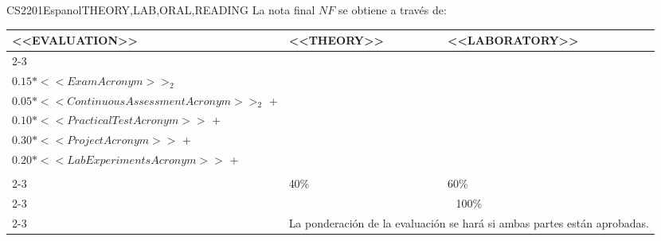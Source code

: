   \begin{evaluation}{CS2201}{Espanol}{THEORY,LAB,ORAL,READING}
  La nota final $NF$ se obtiene a través de:
  
  \begin{tabularx}{0.9\textwidth}{|X|p{}|p{}|} \hline
  \multirow{4}{*}{\uppercase{<<Evaluation>>}} & \uppercase{<<Theory>>} & \uppercase{<<Laboratory>>} \\ \cline{2-3}
  & %
      \begin{minipage}{0.95\textwidth}
      \begin{tabular}{l}
          $0.15*<<ExamAcronym>>_{1}$ + \\
          $0.15*<<ExamAcronym>>_{2}$
          \end{tabular} 
      \end{minipage} 
  & %
      \begin{minipage}{0.95\textwidth}
      \begin{tabular}{l}
          $0.05*<<ContinuousAssessmentAcronym>>_{1}$ + \\
          $0.05*<<ContinuousAssessmentAcronym>>_{2}$ + \\
          $0.10*<<PracticalTestAcronym>>$ + \\
          $0.30*<<ProjectAcronym>>$ + \\
          $0.20*<<LabExperimentsAcronym>>$ + \\
      \end{tabular} 
      \end{minipage}                 \\ \cline{2-3}
  & %
  40\% 
  & %
  60\% \\ \cline{2-3}
  & \multicolumn{2}{|c|}{100\%}  \\ \cline{2-3}
  & \multicolumn{2}{|c|}{La ponderación de la evaluación se hará si ambas partes están aprobadas.}  \\ \hline
  \end{tabularx}
    

\end{evaluation}
